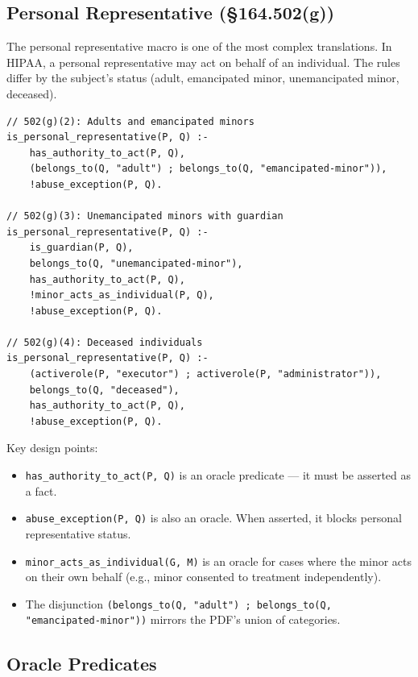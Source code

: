 \documentclass[11pt,letterpaper]{article}
\begin{document}
\subsection{Personal Representative (\S 164.502(g))}
\label{sec:personal-rep}

The personal representative macro is one of the most complex translations. In HIPAA, a personal representative may act on behalf of an individual. The rules differ by the subject's status (adult, emancipated minor, unemancipated minor, deceased).

\begin{lstlisting}[style=soufflestyle,caption={Personal representative rules from hipaa\_macros.dl}]
// 502(g)(2): Adults and emancipated minors
is_personal_representative(P, Q) :-
    has_authority_to_act(P, Q),
    (belongs_to(Q, "adult") ; belongs_to(Q, "emancipated-minor")),
    !abuse_exception(P, Q).

// 502(g)(3): Unemancipated minors with guardian
is_personal_representative(P, Q) :-
    is_guardian(P, Q),
    belongs_to(Q, "unemancipated-minor"),
    has_authority_to_act(P, Q),
    !minor_acts_as_individual(P, Q),
    !abuse_exception(P, Q).

// 502(g)(4): Deceased individuals
is_personal_representative(P, Q) :-
    (activerole(P, "executor") ; activerole(P, "administrator")),
    belongs_to(Q, "deceased"),
    has_authority_to_act(P, Q),
    !abuse_exception(P, Q).
\end{lstlisting}

Key design points:
\begin{itemize}
  \item \texttt{has\_authority\_to\_act(P, Q)} is an oracle predicate --- it must be asserted as a fact.
  \item \texttt{abuse\_exception(P, Q)} is also an oracle. When asserted, it blocks personal representative status.
  \item \texttt{minor\_acts\_as\_individual(G, M)} is an oracle for cases where the minor acts on their own behalf (e.g., minor consented to treatment independently).
  \item The disjunction \texttt{(belongs\_to(Q, "adult") ; belongs\_to(Q, "emancipated-minor"))} mirrors the PDF's union of categories.
\end{itemize}

\subsection{Oracle Predicates}
\end{document}
